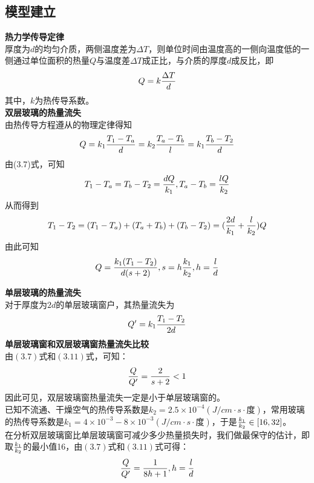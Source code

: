 \documentclass[openany]{progbookcn}
\begin{document}
\subsection{模型建立}
\noindent \textbf{热力学传导定律}\\
\indent 厚度为$d$的均匀介质，两侧温度差为$\Delta T$，则单位时间由温度高的一侧向温度低的一侧通过单位面积的热量$Q$与温度差$\Delta T$成正比，与介质的厚度$d$成反比，即
\begin{equation}
Q=k{{\Delta T}\over d}
\end{equation}
\indent 其中，$k$为热传导系数。\\
\noindent \textbf{双层玻璃的热量流失}\\
\indent 由热传导方程遵从的物理定律得知
\begin{equation}
Q=k_1{{T_1-T_a}\over d}=k_2{{T_a-T_b}\over l}=k_1{{T_b-T_2}\over d}
\end{equation}
\indent 由(3.7)式，可知
\begin{equation}
T_1-T_a=T_b-T_2={{dQ}\over k_1},T_a-T_b={{lQ}\over k_2}
\end{equation}
\indent 从而得到
\begin{equation}
T_1-T_2=(T_1-T_a)+(T_a+T_b)+(T_b-T_2)=({{{2d}\over k_1}+{l\over{k_2}}})Q
\end{equation}
\indent 由此可知
\begin{equation}
Q={{k_1(T_1-T_2)}\over{d(s+2)}},s=h{k_1\over k_2},h={l\over d}
\end{equation}

\noindent \textbf{单层玻璃的热量流失}\\
\indent 对于厚度为$2d$的单层玻璃窗户，其热量流失为
\begin{equation}
Q'=k_1{{T_1-T_2}\over{2d}}
\end{equation}
\noindent \textbf{单层玻璃窗和双层玻璃窗热量流失比较}\\
\indent 由$(3.7)$式和$(3.11)$式，可知：
\begin{equation}
{Q\over Q'}={2\over{s+2}}<1
\end{equation}
\indent 因此可见，双层玻璃窗热量流失一定是小于单层玻璃窗的。\\
\indent 已知不流通、干燥空气的热传导系数是$k_2=2.5\times 10^{-4}(J/cm\cdot s\cdot\mbox{度} )$，常用玻璃的热传导系数是$k_1=4\times 10^{-3}-8\times 10^{-3}(J/cm\cdot s\cdot \mbox{度})$，于是${k_1\over k_2}\in[16,32]$。\\
\indent 在分析双层玻璃窗比单层玻璃窗可减少多少热量损失时，我们做最保守的估计，即取$k_1\over k_2$的最小值16，由$(3.7)$式和$(3.11)$式可得：
\begin{equation}
{Q\over Q'}={1\over{8h+1}},h={l\over d}
\end{equation}
\end{document}
